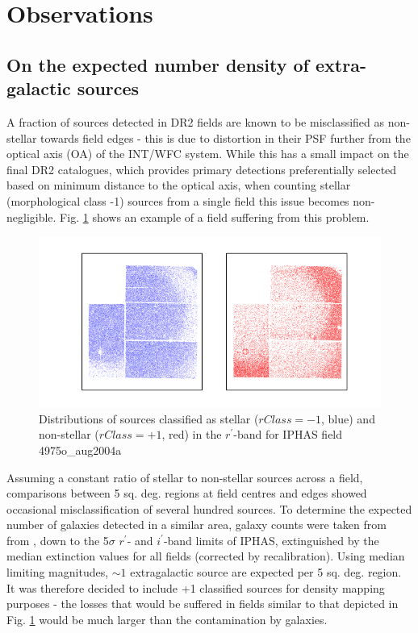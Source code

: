 \documentclass[a4paper,useAMS,usenatbib]{mn2e}
\begin{document}
\section[]{Observations}

\subsection{On the expected number density of extra-galactic sources}
\label{subsec:galaxy_density}

A fraction of sources detected in DR2 fields are known to be misclassified as 
non-stellar towards field edges - this is due to distortion in their PSF further from the optical axis (OA) of the INT/WFC system. While this has a small impact on the final DR2 catalogues, which provides primary detections preferentially selected based on minimum distance to the optical axis, when counting stellar (morphological class -1) sources from a single field this issue becomes non-negligible. Fig. \ref{fig:misclassification} shows an example of a field suffering from this problem.

\begin{figure}
\begin{center}
\includegraphics[width=1\linewidth]{figures/morphology_misclassification.png} 
\caption{\footnotesize{Distributions of sources classified as stellar ($rClass=-1$, blue) 
and non-stellar ($rClass=+1$, red) in the $r^{\prime}$-band for IPHAS field 4975o\_aug2004a} }
\label{fig:misclassification}
\end{center}
\end{figure}

Assuming a constant ratio of stellar to non-stellar sources across a field,
comparisons  between 5 sq. deg. regions at field centres and edges showed
occasional misclassification of  several hundred sources. To determine the
expected number of galaxies detected in a similar area, galaxy counts were taken from from \citet{Yasuda2001}, down to the 5$\sigma$ $r^{\prime}$- and
$i^{\prime}$-band limits   of IPHAS, extinguished by the median \citet{Schlegel1998} extinction values for all fields (corrected by \citet{Schlafly2011} recalibration). Using median limiting magnitudes, $\sim 1$
extragalactic source are expected per 5 sq. deg. region. It was therefore
decided to include +1 classified sources for density mapping purposes - the
losses that would be  suffered in fields similar to that depicted in Fig. \ref{fig:misclassification} would be much larger than  the contamination by galaxies.
\end{document}
